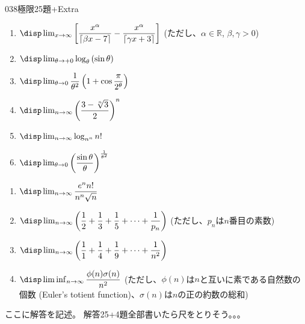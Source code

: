 \begin{prob}{038}{}{極限25題+Extra}
\begin{enumerate}
  \item $\disp \lim_{x\to\infty} \left[\dfrac{x^\alpha}{\left\lceil\beta x-7\right\rceil}-\dfrac{x^\alpha}{\left\lceil\gamma x+3\right\rceil}\right]$ (ただし、$\alpha\in\mathbb{R}$, $\beta, \gamma>0$)
  \item $\disp \lim_{\theta\to +0} \log_\theta \left(\sin\theta\right)$
  \item $\disp \lim_{\theta\to 0} \dfrac{1}{\theta^2}\left(1+\cos\dfrac{\pi}{2^\theta}\right)$
  \item $\disp \lim_{n\to\infty} \left(\dfrac{3-\sqrt[n]{3}}{2}\right)^n$
  \item $\disp \lim_{n\to\infty} \log_{n^n}n!$
  \item $\disp \lim_{\theta\to 0} \left(\dfrac{\sin\theta}{\theta}\right)^{\frac{1}{\theta^2}}$
 \end{enumerate}
 \begin{enumerate}
  \renewcommand{\labelenumi}{Ex\arabic{enumi}}
  \item $\disp \lim_{n\to\infty} \dfrac{e^nn!}{n^n\sqrt{n}}$
  \item $\disp \lim_{n\to\infty} \left(\dfrac{1}{2}+\dfrac{1}{3}+\dfrac{1}{5}+\cdots+\dfrac{1}{p_n}\right)$ (ただし、$p_n$は$n$番目の素数)
  \item $\disp \lim_{n\to\infty} \left(\dfrac{1}{1}+\dfrac{1}{4}+\dfrac{1}{9}+\cdots+\dfrac{1}{n^2}\right)$
  \item $\disp \liminf_{n\to\infty} \dfrac{\phi(n)\sigma(n)}{n^2}$ (ただし、$\phi(n)$は$n$と互いに素である自然数の個数 (Euler's totient function)、$\sigma(n)$は$n$の正の約数の総和)
 \end{enumerate}
\end{prob}
ここに解答を記述。
解答25+4題全部書いたら尺をとりそう。。。